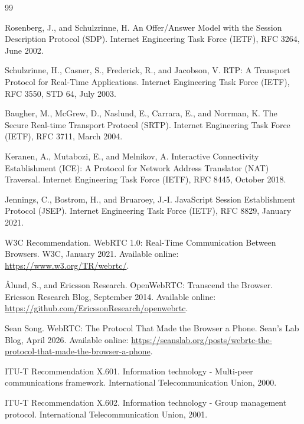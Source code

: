 \documentclass{article}
\begin{document}
\newpage
\begin{thebibliography}{99}

Rosenberg, J., and Schulzrinne, H.
\newblock An Offer/Answer Model with the Session Description Protocol (SDP).
\newblock Internet Engineering Task Force (IETF), RFC 3264, June 2002.

Schulzrinne, H., Casner, S., Frederick, R., and Jacobson, V.
\newblock RTP: A Transport Protocol for Real-Time Applications.
\newblock Internet Engineering Task Force (IETF), RFC 3550, STD 64, July 2003.

Baugher, M., McGrew, D., Naslund, E., Carrara, E., and Norrman, K.
\newblock The Secure Real-time Transport Protocol (SRTP).
\newblock Internet Engineering Task Force (IETF), RFC 3711, March 2004.

Keranen, A., Mutabozi, E., and Melnikov, A.
\newblock Interactive Connectivity Establishment (ICE): A Protocol for Network Address Translator (NAT) Traversal.
\newblock Internet Engineering Task Force (IETF), RFC 8445, October 2018.

Jennings, C., Bostrom, H., and Bruaroey, J.-I.
\newblock JavaScript Session Establishment Protocol (JSEP).
\newblock Internet Engineering Task Force (IETF), RFC 8829, January 2021.

W3C Recommendation.
\newblock WebRTC 1.0: Real-Time Communication Between Browsers.
\newblock W3C, January 2021.
\newblock Available online: \url{https://www.w3.org/TR/webrtc/}.

Ålund, S., and Ericsson Research.
\newblock OpenWebRTC: Transcend the Browser.
\newblock Ericsson Research Blog, September 2014.
\newblock Available online: \url{https://github.com/EricssonResearch/openwebrtc}.

Sean Song.
\newblock WebRTC: The Protocol That Made the Browser a Phone.
\newblock Sean's Lab Blog, April 2026.
\newblock Available online: \url{https://seanslab.org/posts/webrtc-the-protocol-that-made-the-browser-a-phone}.

ITU-T Recommendation X.601.
\newblock Information technology - Multi-peer communications framework.
\newblock International Telecommunication Union, 2000.

ITU-T Recommendation X.602.
\newblock Information technology - Group management protocol.
\newblock International Telecommunication Union, 2001.


\end{thebibliography}
\end{document}
